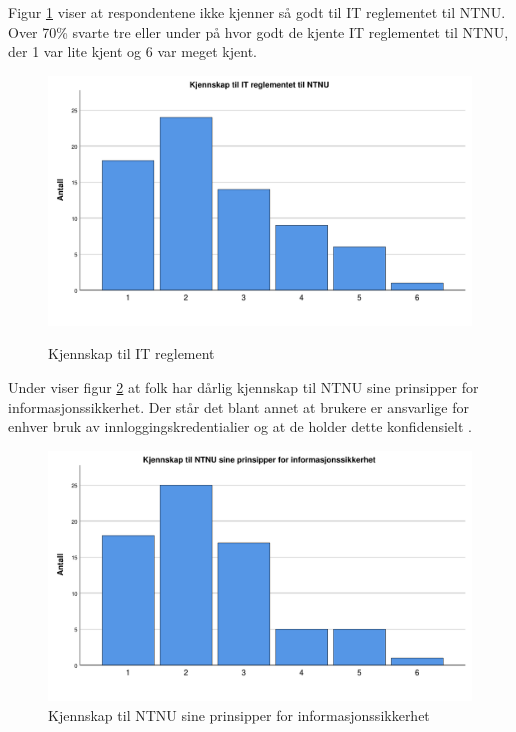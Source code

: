 Figur \ref{fig:ITreglement} viser at respondentene ikke kjenner så godt til IT reglementet til NTNU. Over 70\% svarte tre eller under på hvor godt de kjente IT reglementet til NTNU, der 1 var lite kjent og 6 var meget kjent.  
\begin{figure}[H]
    \centering
    \includegraphics[scale=0.5]{case_2/bilder/spss/ITreglement.pdf}
    \label{fig:ITreglement}
    \caption[ITreglement]{Kjennskap til IT reglement}
\end{figure}

Under viser figur \ref{fig:InfoSecPolicy} at folk har dårlig kjennskap til NTNU sine prinsipper for informasjonssikkerhet. Der står det blant annet at brukere er ansvarlige for enhver bruk av innloggingskredentialier og at de holder dette konfidensielt \cite{PrinsInfoSec}. 
\begin{figure}[H]
    \centering
    \includegraphics[scale=0.5]{case_2/bilder/spss/InfoSecPolicy.pdf}
    \caption[InfoSecPolicy]{Kjennskap til NTNU sine prinsipper for informasjonssikkerhet}
    \label{fig:InfoSecPolicy}
\end{figure}

